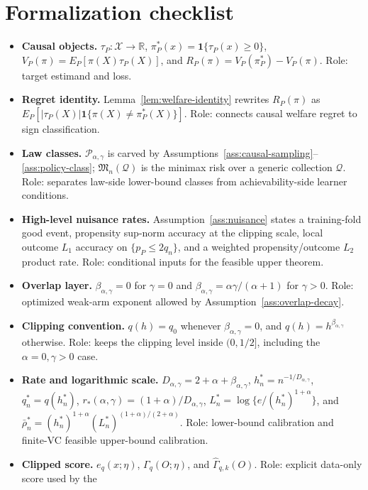 \documentclass[11pt]{article}
\newcommand{\one}{\mathbf{1}}
\theoremstyle{definition}
\theoremstyle{plain}
\theoremstyle{remark}
\begin{document}
\section{Formalization checklist}
\begin{itemize}[leftmargin=*]
\item \textbf{Causal objects.}  \(\tau_P:\mathcal X\to\mathbb R\),
\(\pi_P^*(x)=\one\{\tau_P(x)\ge0\}\), \(V_P(\pi)=E_P[\pi(X)\tau_P(X)]\),
and \(R_P(\pi)=V_P(\pi_P^*)-V_P(\pi)\).  Role: target estimand and loss.
\item \textbf{Regret identity.}  Lemma~\ref{lem:welfare-identity} rewrites
\(R_P(\pi)\) as
\(E_P[|\tau_P(X)|\one\{\pi(X)\ne\pi_P^*(X)\}]\).  Role: connects causal
welfare regret to sign classification.
\item \textbf{Law classes.}  \(\mathcal P_{\alpha,\gamma}\) is carved by
Assumptions~\ref{ass:causal-sampling}--\ref{ass:policy-class};
\(\mathfrak M_n(\mathcal Q)\) is the minimax risk over a generic collection
\(\mathcal Q\).  Role: separates law-side lower-bound classes from
achievability-side learner conditions.
\item \textbf{High-level nuisance rates.}  Assumption~\ref{ass:nuisance}
states a training-fold good event, propensity sup-norm accuracy at the
clipping scale, local outcome \(L_1\) accuracy on \(\{p_P\le2q_n\}\), and a
weighted propensity/outcome \(L_2\) product rate.  Role: conditional inputs
for the feasible upper theorem.
\item \textbf{Overlap layer.}  \(\beta_{\alpha,\gamma}=0\) for \(\gamma=0\)
and \(\beta_{\alpha,\gamma}=\alpha\gamma/(\alpha+1)\) for \(\gamma>0\).
Role: optimized weak-arm exponent allowed by Assumption~\ref{ass:overlap-decay}.
\item \textbf{Clipping convention.}  \(q(h)=q_0\) whenever
\(\beta_{\alpha,\gamma}=0\), and
\(q(h)=h^{\beta_{\alpha,\gamma}}\) otherwise.  Role: keeps the clipping level
inside \((0,1/2]\), including the \(\alpha=0,\gamma>0\) case.
\item \textbf{Rate and logarithmic scale.}
\(D_{\alpha,\gamma}=2+\alpha+\beta_{\alpha,\gamma}\),
\(h_n^*=n^{-1/D_{\alpha,\gamma}}\),
\(q_n^*=q(h_n^*)\),
\(r_*(\alpha,\gamma)=(1+\alpha)/D_{\alpha,\gamma}\),
\(L_n^*=\log\{e/(h_n^*)^{1+\alpha}\}\), and
\(\bar\rho_n^*=(h_n^*)^{1+\alpha}(L_n^*)^{(1+\alpha)/(2+\alpha)}\).
Role: lower-bound calibration and finite-VC feasible upper-bound calibration.
\item \textbf{Clipped score.}  \(e_q(x;\eta)\), \(\Gamma_q(O;\eta)\), and
\(\widehat\Gamma_{q,k}(O)\).  Role: explicit data-only score used by the

\end{itemize}
\end{document}
